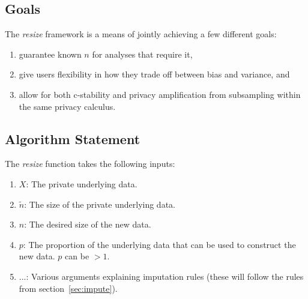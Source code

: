 \documentclass[11pt]{scrartcl} %
\begin{document}
\subsection{Goals}
The \emph{resize} framework is a means of jointly achieving a few different goals:
\begin{enumerate}
    \item guarantee known $n$ for analyses that require it,
    \item give users flexibility in how they trade off between bias and variance, and
    \item allow for both c-stability and privacy amplification from subsampling within the same privacy calculus.
\end{enumerate}

\subsection{Algorithm Statement}
\label{subsec:algorithm_statement}
The \emph{resize} function takes the following inputs:
\begin{enumerate}
    \item $X$: The private underlying data.
    \item $\tilde{n}$: The size of the private underlying data.
    \item $n$: The desired size of the new data.
    \item $p$: The proportion of the underlying data that can be used to construct the new data. $p$ can be $> 1$.
    \item $...$: Various arguments explaining imputation rules (these will follow the rules from section~\ref{sec:impute}).
\end{enumerate}
\end{document}
